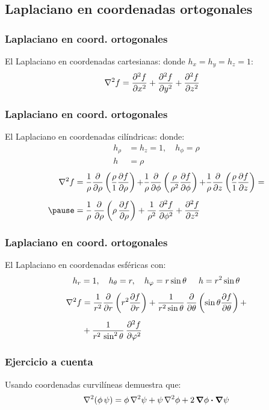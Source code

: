 \documentclass[12pt]{beamer}
\begin{document}
\subsection{Laplaciano en coordenadas ortogonales}

\begin{frame}
\frametitle{Laplaciano en coord. ortogonales}
El Laplaciano en coordenadas cartesianas:
\pause
donde $h_{x} = h_{y} = h_{z} = 1$:
\begin{align*}
\laplacian{f} &= \pdv[2]{f}{x} + \pdv[2]{f}{y} + \pdv[2]{f}{z}
\end{align*}
\end{frame}
\begin{frame}
\frametitle{Laplaciano en coord. ortogonales}
El Laplaciano en coordenadas cilíndricas:
\pause
donde:
\begin{align*}
h_{\rho} &= h_{z} = 1, \quad h_{\phi} = \rho \\
h &= \rho
\end{align*}
\pause
\vspace*{-0.5cm}
\begin{eqnarray*}
\begin{aligned}
\laplacian{f} &= \dfrac{1}{\rho} \pdv{\rho} \left( \dfrac{\rho}{1} \pdv{f}{\rho} \right) {+} \dfrac{1}{\rho} \pdv{\phi} \left( \dfrac{\rho}{\rho^{2}} \pdv{f}{\phi} \right) {+} \dfrac{1}{\rho} \pdv{z} \left( \dfrac{\rho}{1} \pdv{f}{z} \right) = \\[0.5em] \pause
&= \dfrac{1}{\rho} \, \pdv{\rho} \left( \rho \, \pdv{f}{\rho} \right) + \dfrac{1}{\rho^{2}} \, \pdv[2]{f}{\phi} + \pdv[2]{f}{z} 
\end{aligned}
\end{eqnarray*}
\end{frame}
\begin{frame}
\frametitle{Laplaciano en coord. ortogonales}
El Laplaciano en coordenadas esféricas con:
\begin{align*}
h_{r} = 1, \quad h_{\theta} = r, \quad h_{\varphi} = r \sin \theta \hspace{0.5cm} h = r^{2} \sin \theta
\end{align*}
\pause
\vspace*{-0.5cm}
\begin{align*}    
\laplacian{f} &= \dfrac{1}{r^{2}} \pdv{r} \left( r^{2} \pdv{f}{r} \right) + \dfrac{1}{r^{2} \sin \theta} \, \pdv{\theta} \left( \sin \theta \pdv{f}{\theta} \right) + \\[0.5em]
&+ \dfrac{1}{r^{2} \, \sin^{2} \theta} \, \pdv[2]{f}{\varphi}
\end{align*}
\end{frame}
\begin{frame}
\frametitle{Ejercicio a cuenta}
Usando coordenadas curvilíneas demuestra que:
\begin{align*}
\laplacian{(\phi \, \psi)} = \phi \, \laplacian{\psi} + \psi \, \laplacian{\phi} + 2 \, \grad{\phi} \vdot \grad{\psi}
\end{align*}
\end{frame}
\end{document}
